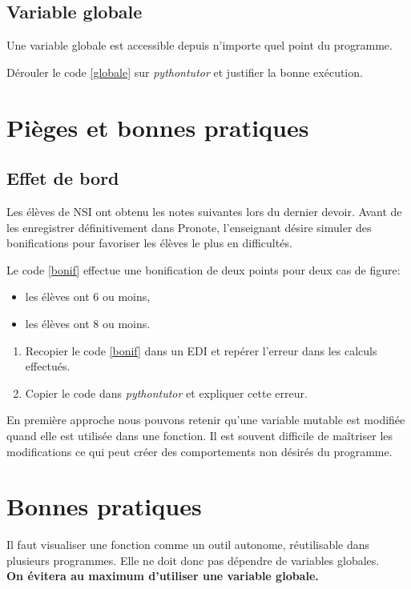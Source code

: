 \documentclass[a4paper,11pt]{article}
\begin{document}
\begin{Form}
\subsection{Variable globale}
\begin{aretenir}[]
Une variable globale est accessible depuis n'importe quel point du programme.
\end{aretenir}
\begin{activite}
Dérouler le code \ref{globale} sur \emph{pythontutor} et justifier la bonne exécution.
\end{activite}
\section{Pièges et bonnes pratiques}
\subsection{Effet de bord}
Les élèves de NSI ont obtenu les notes suivantes lors du dernier devoir. Avant de les enregistrer définitivement dans Pronote, l'enseignant désire simuler des bonifications pour favoriser les élèves le plus en difficultés.
\begin{center}

\label{bonif}
\end{center}
Le code \ref{bonif} effectue une bonification de deux points pour deux cas de figure:
\begin{itemize}
\item les élèves ont 6 ou moins,
\item les élèves ont 8 ou moins.
\end{itemize}
\begin{activite}
\begin{enumerate}
\item Recopier le code \ref{bonif} dans un EDI et repérer l'erreur dans les calculs effectués.
\item Copier le code dans \emph{pythontutor} et expliquer cette erreur.
\end{enumerate}
\end{activite}
\begin{aretenir}
En première approche nous pouvons retenir qu'une variable mutable est modifiée quand elle est utilisée dans une fonction. Il est souvent difficile de maîtriser les modifications ce qui peut créer des comportements non désirés du programme.
\end{aretenir}
\section{Bonnes pratiques}
Il faut visualiser une fonction comme un outil autonome, réutilisable dans plusieurs programmes. Elle ne doit donc pas dépendre de variables globales.\\
\textbf{On évitera au maximum d'utiliser une variable globale.
}
\end{Form}
\end{document}
